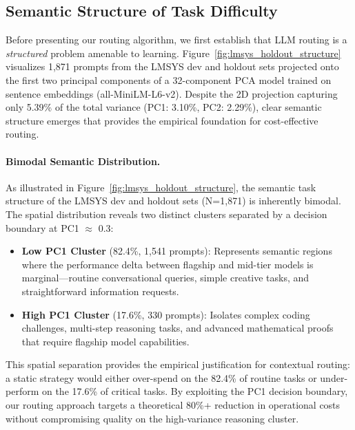 
\subsection{Semantic Structure of Task Difficulty}
\label{sec:semantic_structure}

Before presenting our routing algorithm, we first establish that LLM routing is a \emph{structured} 
problem amenable to learning. Figure~\ref{fig:lmsys_holdout_structure} visualizes 1,871 prompts from 
the LMSYS dev and holdout sets projected onto the first two principal components of a 32-component PCA model 
trained on sentence embeddings (all-MiniLM-L6-v2). Despite the 2D projection capturing only 5.39\% 
of the total variance (PC1: 3.10\%, PC2: 2.29\%), clear semantic structure emerges that provides 
the empirical foundation for cost-effective routing.

\paragraph{Bimodal Semantic Distribution.} As illustrated in Figure~\ref{fig:lmsys_holdout_structure}, 
the semantic task structure of the LMSYS dev and holdout sets (N=1,871) is inherently bimodal. The spatial 
distribution reveals two distinct clusters separated by a decision boundary at PC1 $\approx$ 0.3:

\begin{itemize}[noitemsep,topsep=2pt]
    \item \textbf{Low PC1 Cluster} (82.4\%, 1,541 prompts): Represents semantic regions where the 
    performance delta between flagship and mid-tier models is marginal---routine conversational queries, 
    simple creative tasks, and straightforward information requests.
    \item \textbf{High PC1 Cluster} (17.6\%, 330 prompts): Isolates complex coding challenges, 
    multi-step reasoning tasks, and advanced mathematical proofs that require flagship model capabilities.
\end{itemize}

\noindent This spatial separation provides the empirical justification for contextual routing: a static 
strategy would either over-spend on the 82.4\% of routine tasks or under-perform on the 17.6\% of 
critical tasks. By exploiting the PC1 decision boundary, our routing approach targets a theoretical 
80\%+ reduction in operational costs without compromising quality on the high-variance reasoning cluster.

